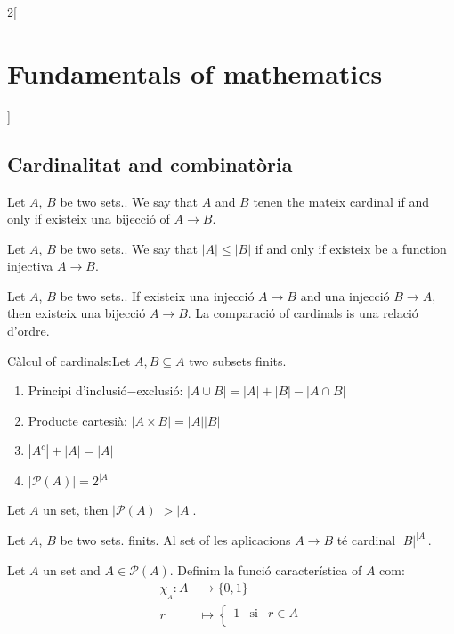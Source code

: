 \documentclass[../../../main.tex]{subfiles}
\begin{document}
\begin{multicols}{2}[\section{Fundamentals of mathematics}]
    \subsection{Cardinalitat and combinatòria}
    \begin{definition}
    Let $A$, $B$ be two sets.. We say that $A$ and $B$ tenen the mateix cardinal if and only if existeix una bijecció of $A\rightarrow B$.
    \end{definition}
    \begin{definition}
    Let $A$, $B$ be two sets.. We say that $|A|\leq|B|$ if and only if existeix be a function injectiva $A\rightarrow B$.
    \end{definition}
    \begin{theorem}
    Let $A$, $B$ be two sets.. If existeix una injecció $A\rightarrow B$ and una injecció $B\rightarrow A$, then existeix una bijecció $A\rightarrow B$. La comparació of cardinals is una relació d'ordre.
    \end{theorem}
    \begin{prop}
    Càlcul of cardinals:\newline Let $A,B\subseteq A$ two subsets finits.
    \begin{enumerate}
        \item Principi d'inclusió$-$exclusió: $|A\cup B|=|A|+|B|-|A\cap B|$
        \item Producte cartesià: $|A\times B|=|A||B|$
        \item $|A^c|+|A|=|A|$
        \item $|\mathcal{P}(A)|=2^{|A|}$
    \end{enumerate}
    \end{prop}
    \begin{theorem}
    Let $A$ un set, then $|\mathcal{P}(A)|>|A|$.
    \end{theorem}
    \begin{prop}
    Let $A$, $B$ be two sets. finits. Al set of les aplicacions $A\rightarrow B$ té cardinal $|B|^{|A|}$.
    \end{prop}
    \begin{definition}
    Let $A$ un set and $A\in \mathcal{P}(A)$. Definim la funció característica of $A$ com: 
    \begin{align*}
        \chi_{\!_A}:A&\rightarrow\{0,1\}\\
        r&\mapsto \left\{
        \begin{array}{rcl}
        1 & \text{si} & r\in A \\

\end{array}
\end{align*}
\end{definition}
\end{multicols}
\end{document}
